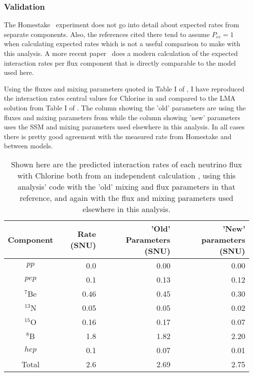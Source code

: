 \subsubsection{Validation}
The Homestake~\cite{homestake} experiment does not go into detail about expected rates from separate components.
Also, the references cited there tend to assume $P_{ee} = 1$ when calculating expected rates which is not a useful comparison to make with this analysis.
A more recent paper~\cite{bachall_lma} does a modern calculation of the expected interaction rates per flux component that is directly comparable to the model used here.

Using the fluxes and mixing parameters quoted in Table I of \cite{bachall_lma}, I have reproduced the interaction rates central values for Chlorine in  and compared to the LMA solution from Table I of \cite{bachall_lma}.
The column showing the 'old' parameters are using the fluxes and mixing parameters from \cite{bachall_lma} while the column showing 'new' parameters uses the SSM and mixing parameters used elsewhere in this analysis.
In all cases there is pretty good agreement with the measured rate from Homestake and between models.

\begin{table}
\centering
\begin{tabular}{c|r|r|r}
Component & \cite{bachall_lma} Rate (SNU) & 'Old' Parameters (SNU) & 'New' parameters (SNU) \\ \hline
$pp$		& 0.0	&	0.00 & 0.00		\\
$pep$		& 0.1 	&	0.13 & 0.12		\\ 
$^7$Be		& 0.46	&	0.45 & 0.30		\\
$^{13}$N	& 0.05 	&	0.05 & 0.02		\\ 
$^{15}$O	& 0.16 	&	0.17 & 0.07		\\ 
$^8$B		& 1.8 	&	1.82 & 2.20		\\ 
$hep$		& 0.1 	&	0.07 & 0.01		\\ \hline
Total		& 2.6	&	2.69 & 2.75		\\ \hline
\end{tabular}
\caption{\label{tbl:chlorine}Shown here are the predicted interaction rates of each neutrino flux with Chlorine both from an independent calculation \cite{bachall_lma}, using this analysis' code with the 'old' mixing and flux parameters in that reference, and again with the flux and mixing parameters used elsewhere in this analysis.}
\end{table}

